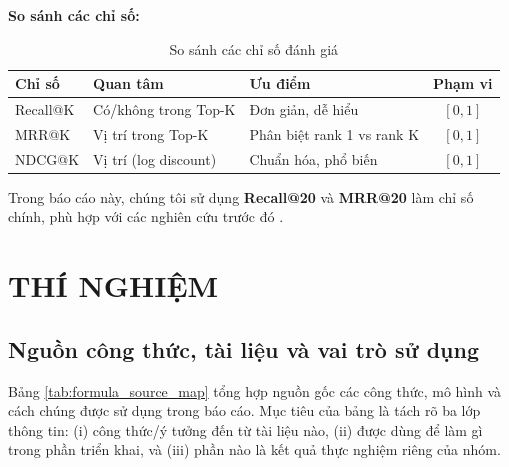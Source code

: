 \documentclass[12pt, a4paper]{article}
\begin{document}
\textbf{So sánh các chỉ số:}

\begin{table}[H]
\centering
\caption{So sánh các chỉ số đánh giá}
\label{tab:metrics_compare}
\begin{tabular}{lp{4cm}p{4cm}c}
\toprule
\textbf{Chỉ số} & \textbf{Quan tâm} & \textbf{Ưu điểm} & \textbf{Phạm vi} \\
\midrule
Recall@K & Có/không trong Top-K & Đơn giản, dễ hiểu & $[0, 1]$ \\
MRR@K & Vị trí trong Top-K & Phân biệt rank 1 vs rank K & $[0, 1]$ \\
NDCG@K & Vị trí (log discount) & Chuẩn hóa, phổ biến & $[0, 1]$ \\
\bottomrule
\end{tabular}
\end{table}

Trong báo cáo này, chúng tôi sử dụng \textbf{Recall@20} và \textbf{MRR@20} làm chỉ số chính, phù hợp với các nghiên cứu trước đó \cite{hidasi2016, ludewig2018}.

\newpage


\section{THÍ NGHIỆM}
\label{chap:experiments}

\subsection{Nguồn công thức, tài liệu và vai trò sử dụng}

Bảng \ref{tab:formula_source_map} tổng hợp nguồn gốc các công thức, mô hình và cách chúng được sử dụng trong báo cáo. Mục tiêu của bảng là tách rõ ba lớp thông tin: (i) công thức/ý tưởng đến từ tài liệu nào, (ii) được dùng để làm gì trong phần triển khai, và (iii) phần nào là kết quả thực nghiệm riêng của nhóm.
\end{document}
